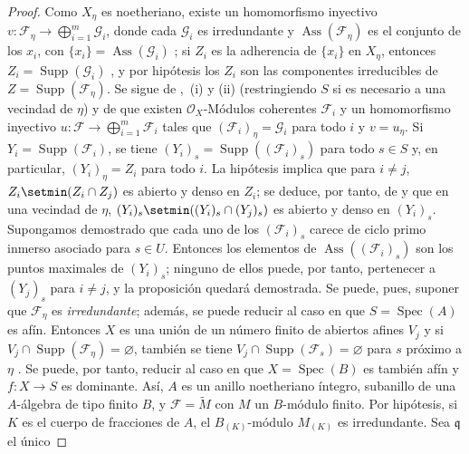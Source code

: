 \begin{proof}
Como $X_\eta$ es noetheriano, existe un homomorfismo inyectivo $v:\mathcal F_\eta\to\bigoplus_{i=1}^m\mathcal G_i$, donde cada $\mathcal G_i$ es irredundante y $\operatorname{Ass}(\mathcal F_\eta)$ es el conjunto de los $x_i$, con $\{x_i\}=\operatorname{Ass}(\mathcal G_i)$ ; si $Z_i$ es la adherencia de $\{x_i\}$ en $X_\eta$, entonces $Z_i=\operatorname{Supp}(\mathcal G_i)$ , y por hipótesis los $Z_i$ son las componentes irreducibles de $Z=\operatorname{Supp}(\mathcal F_\eta)$.
Se sigue de ,~(i) y (ii) (restringiendo $S$ si es necesario a una vecindad de $\eta$) y de  que existen $\mathcal O_X$-Módulos coherentes $\mathcal F_i$ y un homomorfismo inyectivo $u:\mathcal F\to\bigoplus_{i=1}^m\mathcal F_i$ tales que $(\mathcal F_i)_\eta=\mathcal G_i$ para todo $i$ y $v=u_\eta$.
Si $Y_i=\operatorname{Supp}(\mathcal F_i)$, se tiene $(Y_i)_s=\operatorname{Supp}((\mathcal F_i)_s)$ para todo $s\in S$  y, en particular, $(Y_i)_\eta=Z_i$ para todo $i$.
La hipótesis implica que para $i\neq j$, $Z_i\setmin(Z_i\cap Z_j)$ es abierto y denso en $Z_i$; se deduce, por tanto, de  y  que en una vecindad de $\eta$, $(Y_i)_s\setmin((Y_i)_s\cap(Y_j)_s)$ es abierto y denso en $(Y_i)_s$.
Supongamos demostrado que cada uno de los $(\mathcal F_i)_s$ carece de ciclo primo inmerso asociado para $s\in U$.
Entonces los elementos de $\operatorname{Ass}((\mathcal F_i)_s)$ son los puntos maximales de $(Y_i)_s$; ninguno de ellos puede, por tanto, pertenecer a $(Y_j)_s$ para $i\neq j$, y la proposición quedará demostrada. Se puede, pues, suponer que $\mathcal F_\eta$ es \emph{irredundante}; además, se puede reducir al caso en que $S=\operatorname{Spec}(A)$ es afín. Entonces $X$ es una unión de un número finito de abiertos afines $V_j$ y si $V_j\cap\operatorname{Supp}(\mathcal F_\eta)
=\varnothing$, también se tiene $V_j\cap\operatorname{Supp}(\mathcal F_s)=\varnothing$ para $s$ próximo a $\eta$ . Se puede, por tanto, reducir al caso en que $X=\operatorname{Spec}(B)$ es también afín y $f:X\to S$ es dominante. Así, $A$ es un anillo noetheriano íntegro, subanillo de una $A$-álgebra de tipo finito $B$, y $\mathcal F=\widetilde M$ con $M$ un $B$-módulo finito. Por hipótesis, si $K$ es el cuerpo de fracciones de $A$, el $B_{(K)}$-módulo $M_{(K)}$ es irredundante.
Sea $\mathfrak q$ el único



\end{proof}
